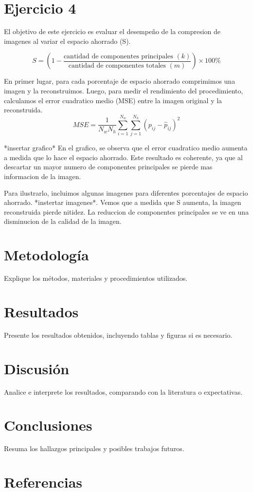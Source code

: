 \documentclass[a4paper,12pt]{article}
\begin{document}
\section{Ejercicio 4}
El objetivo de este ejercicio es evaluar el desempeño de la compresion de imagenes al variar el espacio ahorrado (S). 

\begin{equation}
S = \left( 1 - \frac{\text{cantidad de componentes principales } (k)}{\text{cantidad de componentes totales } (m)} \right) \times 100 \%
\end{equation}

En primer lugar, para cada porcentaje de espacio ahorrado comprimimos una imagen y la reconstruimos. Luego, para medir el rendimiento del procedimiento, calculamos el error cuadratico medio (MSE) entre la imagen original y la reconstruida. 
\begin{equation}
MSE = \frac{1}{N_w N_h} \sum_{i=1}^{N_w} \sum_{j=1}^{N_h} (p_{ij} - \hat{p}_{ij})^2
\end{equation}

*insertar grafico*
En el grafico, se observa que el error cuadratico medio aumenta a medida que lo hace el espacio ahorrado. Este resultado es coherente, ya que al descartar un mayor numero de componentes principales se pierde mas informacion de la imagen. 

Para ilustrarlo, incluimos algunas imagenes para diferentes porcentajes de espacio ahorrado. 
*instertar imagenes*.
Vemos que a medida que S aumenta, la imagen reconstruida pierde nitidez. La reduccion de componentes principales se ve en una disminucion de la calidad de la imagen. 


\section{Metodología}
Explique los métodos, materiales y procedimientos utilizados.

\section{Resultados}
Presente los resultados obtenidos, incluyendo tablas y figuras si es necesario.

\section{Discusión}
Analice e interprete los resultados, comparando con la literatura o expectativas.

\section{Conclusiones}
Resuma los hallazgos principales y posibles trabajos futuros.

\section*{Referencias}


\end{document}
